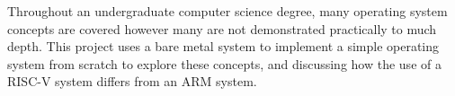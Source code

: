 
Throughout an undergraduate computer science degree, many operating system concepts are covered however many are not demonstrated practically to much depth. This project uses a bare metal system to implement a simple operating system from scratch to explore these concepts, and discussing how the use of a RISC-V system differs from an ARM system.